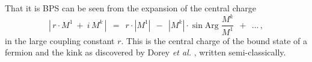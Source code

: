 \documentclass[epsfig,12pt]{article}
\def\beq{\begin{equation}}
\def\eeq{\end{equation}}
\def\beq{\begin{equation}}
\def\eeq{\end{equation}}
\newcommand{\mc}[1]{\mathcal{#1}}
\begin{document}
       That it is BPS can be seen from the expansion of the central charge
\beq
       |\, r \cdot M^1  ~+~ i\, M^k \,|  ~~=~~ r \cdot | M^1 |  ~~-~~ | M^k | \cdot \sin \text{Arg}\; \frac { M^k } 
                                                                                                            { M^1 }  
                                                                ~~+~~ ... \,,
\eeq
       in the large coupling constant $ r $.
       This is the central charge of the bound state of a fermion and the kink 
       as discovered by Dorey {\it et al.} \cite{Dorey:1999zk}, written semi-classically.





\end{document}
